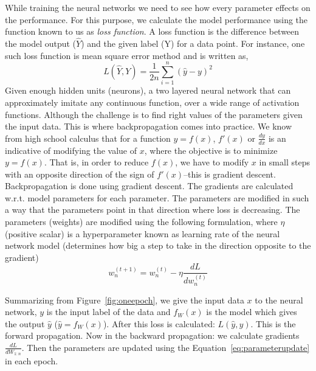 While training the neural networks we need to see how every parameter effects on the performance. For this purpose, we calculate the model performance using the function known to us as \emph{loss function}. A loss function is the difference between the model output ($\hat{Y}$) and the given label (Y) for a data point. For instance, one such loss function is mean square error method and is written as, 
\begin{equation}
    L(\hat{Y},Y) = \frac{1}{2n}\sum_{i=1}^{n}(\hat{y}-y)^2
\end{equation}
Given enough hidden units (neurons), a two layered neural network that can approximately imitate any continuous function, over a wide range of activation functions. Although the challenge is to find right values of the parameters given the input data. This is where backpropagation comes into practice. 
We know from high school calculus that for a function $y = f(x)$, $f'(x)$ or $\frac{dy}{dx}$ is an indicative of modifying the value of $x$, where the objective is to minimize $y = f(x)$. That is, in order to reduce $f(x)$, we have to modify $x$ in small steps with an opposite direction of the sign of $f'(x)$--this is gradient descent. Backpropagation is done using gradient descent. The gradients are calculated w.r.t. model parameters for each parameter. The parameters are modified in such a way that the parameters point in that direction where loss is decreasing. The parameters (weights) are modified using the following formulation, where $\eta$ (positive scalar) is a hyperparameter known as learning rate of the neural network model (determines how big a step to take in the direction opposite to the gradient)
\begin{equation}
    w_{n}^{(t+1)} = w_{n}^{(t)} - \eta\frac{dL}{dw_{n}^{(t)}}
    \label{eq:parameterupdate}
\end{equation}

Summarizing from Figure~\ref{fig:oneepoch}, we give the input data $x$ to the neural network, $y$ is the input label of the data and $f_W(x)$ is the model which gives the output $\hat{y}$ ($\hat{y} = f_W(x)$). After this loss is calculated: $L(\hat{y}, y)$. This is the forward propagation. 
Now in the backward  propagation: we calculate gradients $\frac{dL}{dW_{1:n}}$. Then the parameters are updated using the Equation~\ref{eq:parameterupdate} in each epoch. 

